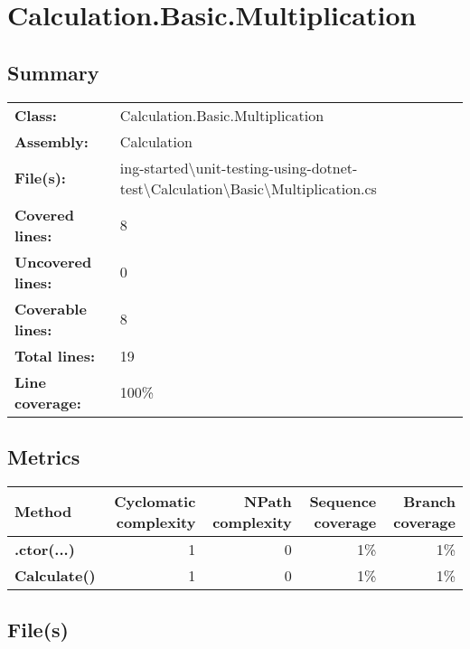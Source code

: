 \documentclass[a4paper,landscape,10pt]{article}
\begin{document}
\section{Calculation.Basic.Multiplication}
\subsection{Summary}
\begin{longtable}[l]{ll}
\textbf{Class:} & Calculation.Basic.Multiplication\\
\textbf{Assembly:} & Calculation\\
\textbf{File(s):} & \begin{minipage}[t]{12cm}{ing-started\textbackslash unit-testing-using-dotnet-test\textbackslash Calculation\textbackslash Basic\textbackslash Multiplication.cs}\end{minipage} \\
\textbf{Covered lines:} & 8\\
\textbf{Uncovered lines:} & 0\\
\textbf{Coverable lines:} & 8\\
\textbf{Total lines:} & 19\\
\textbf{Line coverage:} & 100\%\\
\end{longtable}
\subsection{Metrics}
\begin{longtable}[l]{|l|r|r|r|r|}
\hline
\textbf{Method} & \textbf{Cyclomatic complexity} & \textbf{NPath complexity} & \textbf{Sequence coverage} & \textbf{Branch coverage}\\
\hline
\textbf{.ctor(...)} & 1 & 0 & 1\% & 1\%\\
\hline
\textbf{Calculate()} & 1 & 0 & 1\% & 1\%\\
\hline
\end{longtable}
\subsection{File(s)}
\end{document}
